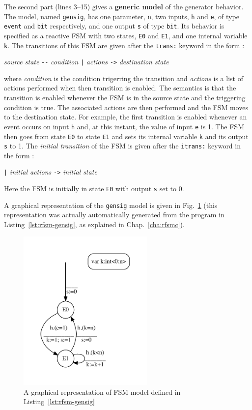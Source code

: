 \medskip The second part (lines 3--15) gives a \textbf{generic model} of the generator behavior. The
model, named \verb|gensig|, has one parameter, \verb|n|, two inputs, \verb|h| and \verb|e|, of type
\verb|event| and \verb|bit| respectively, and one output \verb|s| of type \verb|bit|. Its behavior
is specified as a reactive FSM with two states, \verb|E0| and \verb|E1|, and one internal variable
\verb|k|. The transitions of this FSM are given after the \verb|trans:| keyword in the form :
\begin{center}
\emph{source state} \verb|--| \emph{condition} \verb'|' \emph{actions} \verb|->| \emph{destination state}
\end{center}
where \emph{condition} is the condition trigerring the transition and \emph{actions} is a list of
actions performed when then transition is enabled.  The semantics is that the transition is enabled
whenever the FSM is in the source state and the triggering condition is true. The associated actions
are then performed and the FSM moves to the destination state. For example, the first transition is
enabled whenever an event occurs on input \verb|h| and, at this instant, the value of input \verb|e|
is 1. The FSM then goes from state \verb|E0| to state \verb|E1| and sets its internal variable 
\verb|k| and its output \verb|s| to 1. The \emph{initial transition} of the FSM is given 
after the \verb|itrans:| keyword in the form :
\begin{center}
\verb'|' \emph{initial actions} \verb|->| \emph{initial state}
\end{center}
Here the FSM is initially in state \verb|E0| with output \verb|s| set to 0.

A graphical representation of the \verb|gensig| model is given in
Fig.~\ref{fig:rfsm-gensig-model} (this representation was actually automatically generated from the
program in Listing~\ref{lst:rfsm-gensig}, as explained in Chap.~\ref{cha:rfsmc}). 

\begin{figure}[h]
   \includegraphics[height=8cm]{figs/gensig-model}
   \centering
  \caption{A graphical representation of FSM model defined in Listing~\ref{lst:rfsm-gensig}}
  \label{fig:rfsm-gensig-model}
\end{figure}

